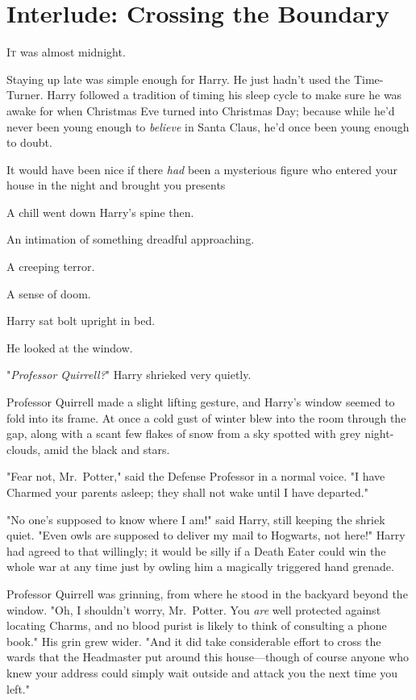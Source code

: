 \chapter{Interlude: Crossing the Boundary}

\lettrine{I}{t} was almost
midnight.

Staying up late was simple enough for Harry. He just hadn't used the
Time-Turner. Harry followed a tradition of timing his sleep cycle to make sure
he was awake for when Christmas Eve turned into Christmas Day; because while
he'd never been young enough to \emph{believe} in Santa Claus, he'd once been
young enough to doubt.

It would have been nice if there \emph{had} been a mysterious figure who
entered your house in the night and brought you presents{\el}

A chill went down Harry's spine then.

An intimation of something dreadful approaching.

A creeping terror.

A sense of doom.

Harry sat bolt upright in bed.

He looked at the window.

"\emph{Professor Quirrell?}" Harry shrieked very quietly.

Professor Quirrell made a slight lifting gesture, and Harry's window seemed to
fold into its frame. At once a cold gust of winter blew into the room through
the gap, along with a scant few flakes of snow from a sky spotted with grey
night-clouds, amid the black and stars.

"Fear not, Mr.~Potter," said the Defense Professor in a normal voice. "I have
Charmed your parents asleep; they shall not wake until I have departed."

"No one's supposed to know where I am!" said Harry, still keeping the shriek
quiet. "Even owls are supposed to deliver my mail to Hogwarts, not here!" Harry
had agreed to that willingly; it would be silly if a Death Eater could win the
whole war at any time just by owling him a magically triggered hand grenade.

Professor Quirrell was grinning, from where he stood in the backyard beyond the
window. "Oh, I shouldn't worry, Mr.~Potter. You \emph{are} well protected
against locating Charms, and no blood purist is likely to think of consulting a
phone book." His grin grew wider. "And it did take considerable effort to cross
the wards that the Headmaster put around this house---though of course anyone
who knew your address could simply wait outside and attack you the next time
you left."

